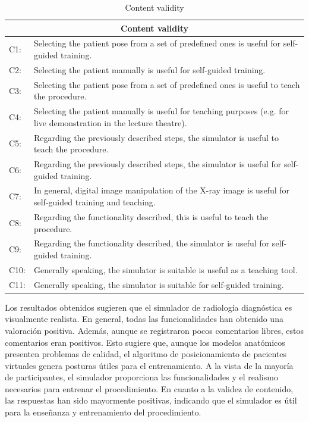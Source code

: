 \begin{table}[hb]
    \centering
    \begin{tabular}{lp{14cm}}
    \hline
    \multicolumn{2}{c}{Content validity }
    \\
    \hline
    C1:     &  Selecting the patient pose from a set of predefined ones is useful for self-guided training.  \\
    C2:     & Selecting the patient manually is useful for self-guided training.   \\
    C3:     & Selecting the patient pose from a set of predefined ones is useful to teach the procedure.   \\
    C4:     & Selecting the patient manually is useful for teaching purposes (e.g. for live demonstration in the lecture theatre).    \\
    C5:     &  Regarding the previously described steps, the simulator is useful to teach the procedure.  \\
    C6:     & Regarding the previously described steps, the simulator is useful for self-guided training.  \\
    C7:     & In general, digital image manipulation of the X-ray image is useful for self-guided training and teaching.  \\
    C8:     & Regarding the functionality described, this is useful to teach the procedure.   \\
    C9:     & Regarding the functionality described, the simulator is useful  for self-guided training.  \\
    C10:     & Generally speaking, the simulator is suitable is useful as a teaching tool.   \\
    C11:     & Generally speaking, the simulator is suitable for self-guided training.   \\
    \hline
    \end{tabular}
    \caption{Content validity}
    \label{tab:contentvalidity}
\end{table}

Los resultados obtenidos sugieren que el simulador de radiología diagnóstica es visualmente realista. En general, todas las funcionalidades han obtenido una valoración positiva. Además, aunque se registraron pocos comentarios libres, estos comentarios eran positivos. Esto sugiere que, aunque los modelos anatómicos presenten problemas de calidad, el algoritmo de posicionamiento de pacientes virtuales genera posturas útiles para el entrenamiento. A la vista de la mayoría de participantes, el simulador proporciona las funcionalidades y el realismo necesarios para entrenar el procedimiento. En cuanto a la validez de contenido, las respuestas han sido mayormente positivas, indicando que el simulador es útil para la enseñanza y entrenamiento del procedimiento. 

